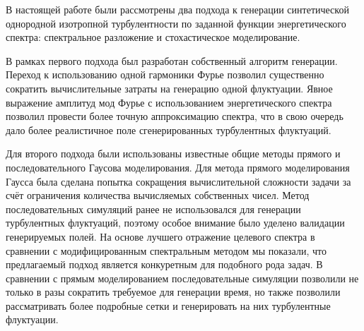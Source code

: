 
В настоящей работе были рассмотрены два подхода к генерации синтетической однородной изотропной турбулентности по
заданной функции энергетического спектра: спектральное разложение и стохастическое моделирование.

В рамках первого подхода был разработан собственный алгоритм генерации.
Переход к использованию одной гармоники Фурье позволил существенно сократить вычислительные затраты на генерацию одной флуктуации.
Явное выражение амплитуд мод Фурье с использованием энергетического спектра позволил провести более точную аппроксимацию спектра,
что в свою очередь дало более реалистичное поле сгенерированных турбулентных флуктуаций.

Для второго подхода были использованы известные общие методы
прямого и последовательного Гаусова моделирования.
Для метода прямого моделирования Гаусса была сделана попытка сокращения вычислительной сложности задачи за счёт
ограничения количества вычисляемых собственных чисел.
Метод последовательных симуляций ранее не использовался для генерации турбулентных флуктуаций, поэтому особое внимание было уделено валидации генерируемых полей.
На основе лучшего отражение целевого спектра
в сравнении с модифицированным спектральным методом мы показали, что предлагаемый подход является конкуретным для подобного рода задач.
В сравнении с прямым моделированием последовательные симуляции позволили не только в разы сократить требуемое для генерации время,
но также позволили рассматривать более подробные сетки и генерировать на них турбулентные флуктуации.

